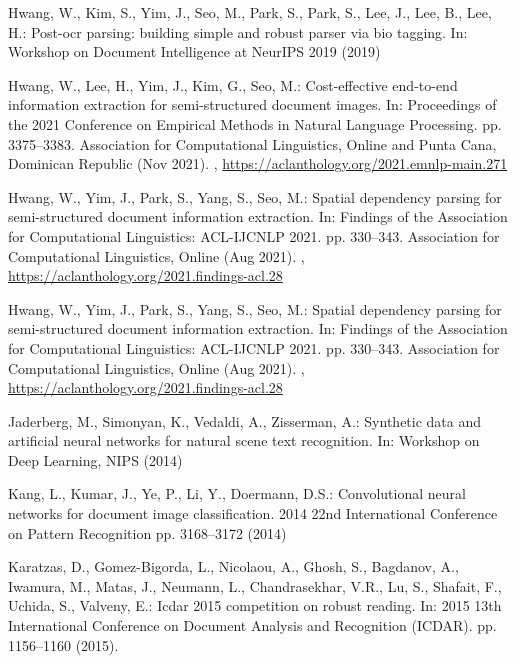 \documentclass[runningheads]{llncs}
\begin{document}
\begin{thebibliography}{10}
Hwang, W., Kim, S., Yim, J., Seo, M., Park, S., Park, S., Lee, J., Lee, B.,
  Lee, H.: Post-ocr parsing: building simple and robust parser via bio tagging.
  In: Workshop on Document Intelligence at NeurIPS 2019 (2019)

Hwang, W., Lee, H., Yim, J., Kim, G., Seo, M.: Cost-effective end-to-end
  information extraction for semi-structured document images. In: Proceedings
  of the 2021 Conference on Empirical Methods in Natural Language Processing.
  pp. 3375--3383. Association for Computational Linguistics, Online and Punta
  Cana, Dominican Republic (Nov 2021). ,
  \url{https://aclanthology.org/2021.emnlp-main.271}

Hwang, W., Yim, J., Park, S., Yang, S., Seo, M.: Spatial dependency parsing for
  semi-structured document information extraction. In: Findings of the
  Association for Computational Linguistics: ACL-IJCNLP 2021. pp. 330--343.
  Association for Computational Linguistics, Online (Aug 2021).
  ,
  \url{https://aclanthology.org/2021.findings-acl.28}

Hwang, W., Yim, J., Park, S., Yang, S., Seo, M.: Spatial dependency parsing for
  semi-structured document information extraction. In: Findings of the
  Association for Computational Linguistics: ACL-IJCNLP 2021. pp. 330--343.
  Association for Computational Linguistics, Online (Aug 2021).
  ,
  \url{https://aclanthology.org/2021.findings-acl.28}

Jaderberg, M., Simonyan, K., Vedaldi, A., Zisserman, A.: Synthetic data and
  artificial neural networks for natural scene text recognition. In: Workshop
  on Deep Learning, NIPS (2014)

Kang, L., Kumar, J., Ye, P., Li, Y., Doermann, D.S.: Convolutional neural
  networks for document image classification. 2014 22nd International
  Conference on Pattern Recognition pp. 3168--3172 (2014)

Karatzas, D., Gomez-Bigorda, L., Nicolaou, A., Ghosh, S., Bagdanov, A.,
  Iwamura, M., Matas, J., Neumann, L., Chandrasekhar, V.R., Lu, S., Shafait,
  F., Uchida, S., Valveny, E.: Icdar 2015 competition on robust reading. In:
  2015 13th International Conference on Document Analysis and Recognition
  (ICDAR). pp. 1156--1160 (2015). 


\end{thebibliography}
\end{document}
